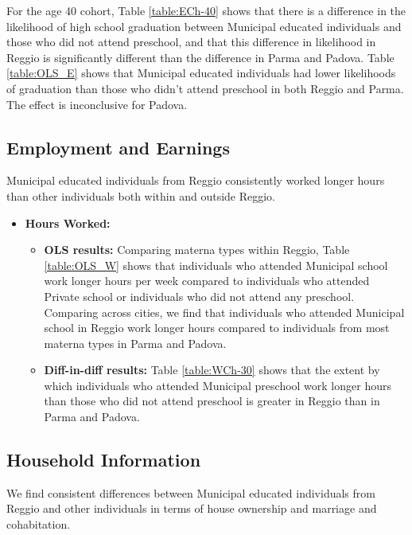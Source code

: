 \documentclass[11pt]{article}
\begin{document}
\begin{itemize}
\begin{itemize}
	For the age 40 cohort, Table \ref{table:ECh-40} shows that there is a difference in the likelihood of high school graduation between Municipal educated individuals and those who did not attend preschool, and that this difference in likelihood in Reggio is significantly different than the difference in Parma and Padova. Table \ref{table:OLS_E} shows that Municipal educated individuals had lower likelihoods of graduation than those who didn't attend preschool in both Reggio and Parma. The effect is inconclusive for Padova.
	
		 	\end{itemize}
\end{itemize}

\subsection{Employment and Earnings}
Municipal educated individuals from Reggio consistently worked longer hours than other individuals both within and outside Reggio.

\begin{itemize}

\item \textbf{Hours Worked:} 
	\begin{itemize}
	\item \textbf{OLS results:}
Comparing materna types within Reggio, Table \ref{table:OLS_W} shows that individuals who attended Municipal school work longer hours per week compared to individuals who attended Private school or individuals who did not attend any preschool. Comparing across cities, we find that individuals who attended Municipal school in Reggio work longer hours compared to individuals from most materna types in Parma and Padova.

	\item \textbf{Diff-in-diff results:} Table \ref{table:WCh-30} shows that the extent by which individuals who attended Municipal preschool work longer hours than those who did not attend preschool is greater in Reggio than in Parma and Padova.
	\end{itemize}
	
\end{itemize}  

\subsection{Household Information}
We find consistent differences between Municipal educated individuals from Reggio and other individuals in terms of house ownership and marriage and cohabitation.
\end{document}
